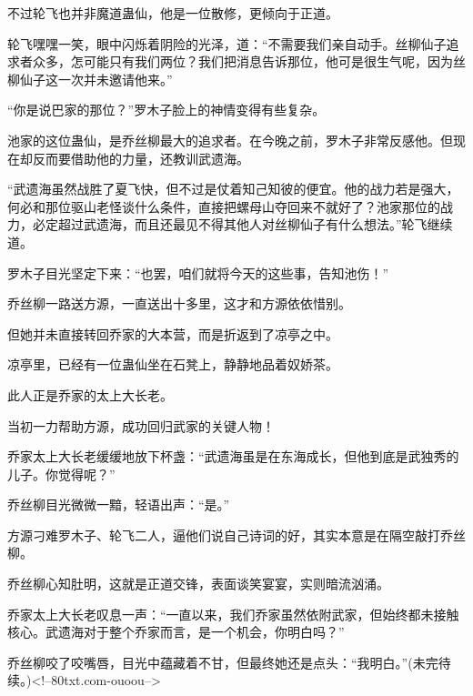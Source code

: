 \begin{this_body}
不过轮飞也并非魔道蛊仙，他是一位散修，更倾向于正道。

轮飞嘿嘿一笑，眼中闪烁着阴险的光泽，道：“不需要我们亲自动手。丝柳仙子追求者众多，怎可能只有我们两位？我们把消息告诉那位，他可是很生气呢，因为丝柳仙子这一次并未邀请他来。”

“你是说巴家的那位？”罗木子脸上的神情变得有些复杂。

池家的这位蛊仙，是乔丝柳最大的追求者。在今晚之前，罗木子非常反感他。但现在却反而要借助他的力量，还教训武遗海。

“武遗海虽然战胜了夏飞快，但不过是仗着知己知彼的便宜。他的战力若是强大，何必和那位驱山老怪谈什么条件，直接把螺母山夺回来不就好了？池家那位的战力，必定超过武遗海，而且还最见不得其他人对丝柳仙子有什么想法。”轮飞继续道。

罗木子目光坚定下来：“也罢，咱们就将今天的这些事，告知池伤！”

乔丝柳一路送方源，一直送出十多里，这才和方源依依惜别。

但她并未直接转回乔家的大本营，而是折返到了凉亭之中。

凉亭里，已经有一位蛊仙坐在石凳上，静静地品着奴娇茶。

此人正是乔家的太上大长老。

当初一力帮助方源，成功回归武家的关键人物！

乔家太上大长老缓缓地放下杯盏：“武遗海虽是在东海成长，但他到底是武独秀的儿子。你觉得呢？”

乔丝柳目光微微一黯，轻语出声：“是。”

方源刁难罗木子、轮飞二人，逼他们说自己诗词的好，其实本意是在隔空敲打乔丝柳。

乔丝柳心知肚明，这就是正道交锋，表面谈笑宴宴，实则暗流汹涌。

乔家太上大长老叹息一声：“一直以来，我们乔家虽然依附武家，但始终都未接触核心。武遗海对于整个乔家而言，是一个机会，你明白吗？”

乔丝柳咬了咬嘴唇，目光中蕴藏着不甘，但最终她还是点头：“我明白。”(未完待续。)<!--80txt.com-ouoou-->

\end{this_body}

